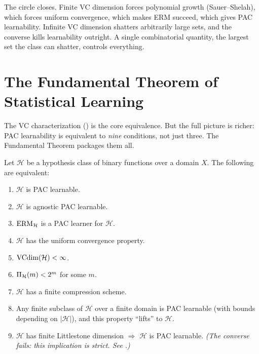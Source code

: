 The circle closes.  Finite VC dimension forces polynomial growth
(Sauer--Shelah), which forces uniform convergence, which makes ERM
succeed, which gives PAC learnability.  Infinite VC dimension shatters
arbitrarily large sets, and the converse kills learnability outright.
A single combinatorial quantity, the largest set the class can
shatter, controls everything.



\section{The Fundamental Theorem of Statistical Learning}
\label{sec:fundamental}

The VC characterization () is the core equivalence.  But the
full picture is richer: PAC learnability is equivalent to \emph{nine}
conditions, not just three.  The Fundamental Theorem packages them all.

\begin{thm}
\label{thm:fundamental}
Let $\mathcal{H}$ be a hypothesis class of binary functions over a domain $X$.
The following are equivalent:
\begin{enumerate}[label=\textnormal{(F\arabic*)}]
\item \label{F:pac} $\mathcal{H}$ is PAC learnable.
\item \label{F:agpac} $\mathcal{H}$ is agnostic PAC learnable.
\item \label{F:erm} $\operatorname{ERM}_\mathcal{H}$ is a PAC learner for $\mathcal{H}$.
\item \label{F:uc} $\mathcal{H}$ has the uniform convergence property.
\item \label{F:finvc} $\mathrm{VCdim}(\mathcal{H}) < \infty$.
\item \label{F:fingrowth} $\Pi_\mathcal{H}(m) < 2^m$ for some $m$.
\item \label{F:compression} $\mathcal{H}$ has a finite compression scheme.
\item \label{F:finiteness} Any finite subclass of $\mathcal{H}$ over a
  finite domain is PAC learnable (with bounds depending on $|\mathcal{H}|$),
  and this property ``lifts'' to $\mathcal{H}$.
\item \label{F:online} $\mathcal{H}$ has finite Littlestone dimension
  $\Longrightarrow$ $\mathcal{H}$ is PAC learnable. \emph{(The converse fails:
  this implication is strict.  See .)}
\end{enumerate}
\end{thm}

